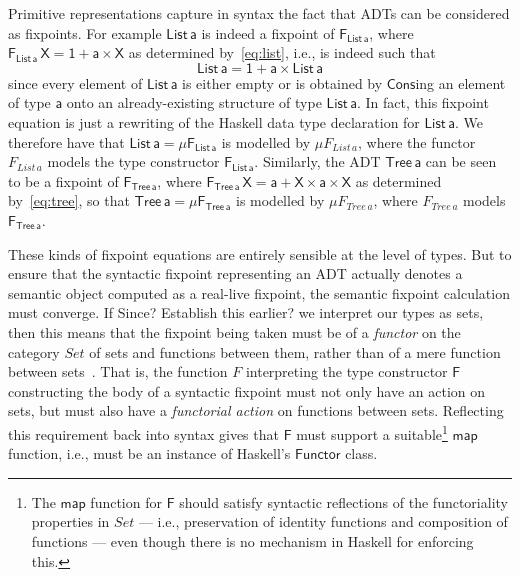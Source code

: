 \documentclass[acmsmall,screen,review,anonymous]{acmart}
\theoremstyle{definition}
\begin{document}
Primitive representations capture in syntax the fact that ADTs can be
considered as fixpoints. For example $\mathsf{List\,a}$ is indeed a
fixpoint of $\mathsf{F_{List\,a}}$, where $\mathsf{F_{List\,a}\,X} =
\mathsf{1 + a \times X}$ as determined by~\eqref{eq:list}, i.e., is
indeed such that
\[\mathsf{List\,a} = \mathsf{1 + a \times List\,a}\] 
since every element of $\mathsf{List\,a}$ is either empty or is
obtained by $\mathsf{Cons}$ing an element of type $\mathsf{a}$ onto an
already-existing structure of type $\mathsf{List\,a}$. In fact, this
fixpoint equation is just a rewriting of the Haskell data type
declaration for $\mathsf{List\,a}$. We therefore have that
$\mathsf{List\, a} = \mathsf{\mu F_{List\,a}}$ is modelled by $\mu
F_{\mathit{List}\,a}$, where the functor $F_{\mathit{List}\,a}$ models
the type constructor $\mathsf{F_{List\,a}}$. Similarly, the ADT
$\mathsf{Tree\,a}$ can be seen to be a fixpoint of
$\mathsf{F_{Tree\,a}}$, where $\mathsf{F_{Tree\,a}\,X} = \mathsf{a + X
  \times a \times X}$ as determined by~\eqref{eq:tree}, so that
$\mathsf{Tree\, a} = \mathsf{ \mu F_{Tree\,a}}$ is modelled by $\mu
F_{\mathit{Tree}\,a}$, where $F_{\mathit{Tree}\,a} $ models
$\mathsf{F_{Tree\,a}}$.
 
These kinds of fixpoint equations are entirely sensible at the level
of types. But to ensure that the syntactic fixpoint representing an
ADT actually denotes a semantic object computed as a real-live
fixpoint, the semantic fixpoint calculation must converge.  If
{\color{blue} Since? Establish this earlier?} we interpret our types
as sets, then this means that the fixpoint being taken must be of a
{\em functor} on the category $\mathit{Set}$ of sets and functions
between them, rather than of a mere function between sets~\cite{tfca}.
That is, the function $F$ interpreting the type constructor
$\mathsf{F}$ constructing the body of a syntactic fixpoint must not
only have an action on sets, but must also have a {\em functorial
  action} on functions between sets. Reflecting this requirement back
into syntax gives that $\mathsf{F}$ must support a
suitable\footnote{The $\mathsf{map}$ function for $\mathsf{F}$ should
  satisfy syntactic reflections of the functoriality properties in
  $\mathit{Set}$ --- i.e., preservation of identity functions and
  composition of functions --- even though there is no mechanism in
  Haskell for enforcing this.} $\mathsf{map}$ function, i.e., must be
an instance of Haskell's $\mathsf{Functor}$ class.
\end{document}
